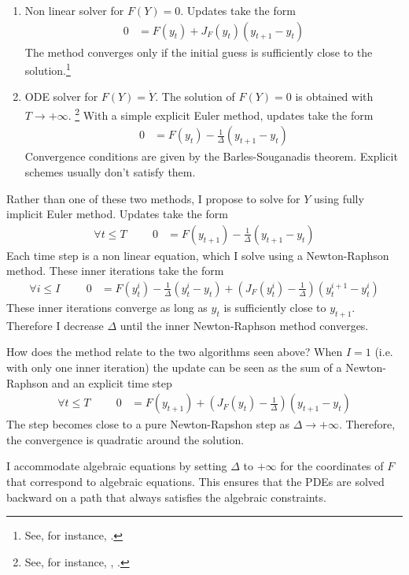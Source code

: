 \documentclass[english]{article}
\begin{document}
	\begin{enumerate}
		\item Non linear solver for $F (Y ) = 0$. Updates take the form
		\begin{align*}
			0 &= F(y_{t}) + J_{F}(y_t) (y_{t+1} - y_t)
		\end{align*}
		The method converges only if the initial guess is sufficiently close to the solution.\footnote{See, for instance, \citet{campbell1999force}.}
		\item ODE solver for $F(Y) = \dot{Y}$. The solution of $F(Y)=0$ is obtained with $T\rightarrow +\infty$. \footnote{See, for instance, \citet{ditellabalance}, \citet{silva2015risk}.}
		With a simple explicit Euler method, updates take the form
		\begin{align*}
			0&= F(y_t) - \frac{1}{\Delta} (y_{t+1} -y_{t})
		\end{align*}
		Convergence conditions are given by the Barles-Souganadis theorem. Explicit schemes usually don't satisfy them.
	\end{enumerate}
	Rather than one of these two methods, I propose to solve for $Y$ using fully implicit Euler method.  Updates take the form 
	\begin{align*}
		\forall t \leq T \hspace{1cm} 0&= F(y_{t+1}) - \frac{1}{\Delta}(y_{t+1} -y_{t})
	\end{align*}
	Each time step is a non linear equation, which I solve using a Newton-Raphson method. These inner iterations take the form
	\begin{align*}
		\forall i \leq I \hspace{1cm}	0 &= F(y_{t}^i) - \frac{1}{\Delta}(y_{t}^{i} -y_{t}) + (J_{F}(y_t^i) -  \frac{1}{\Delta})(y^{i+1}_{t} - y_t^i)
	\end{align*}
	These inner iterations converge as long as $y_t$ is sufficiently close to $y_{t+1}$. Therefore I decrease $\Delta$ until the inner Newton-Raphson method converges.\par
	How does the method relate to the two algorithms seen above? When $I =1$ (i.e. with only one inner iteration) the update can be seen as the sum of a Newton-Raphson and an explicit time step
	\begin{align*}
		\forall t \leq T \hspace{1cm} 0&= F(y_{t+1}) + (J_{F}(y_t) - \frac{1}{\Delta})(y_{t+1} -y_{t})
	\end{align*}
	The step becomes close to a pure Newton-Rapshon step as $\Delta \rightarrow + \infty$. Therefore, the convergence is quadratic around the solution. \par
	I accommodate algebraic equations by setting $\Delta$ to $+\infty$ for the coordinates  of $F$ that correspond to algebraic equations. This ensures that the PDEs are solved backward on a path that always satisfies the algebraic constraints.\par
\end{document}
